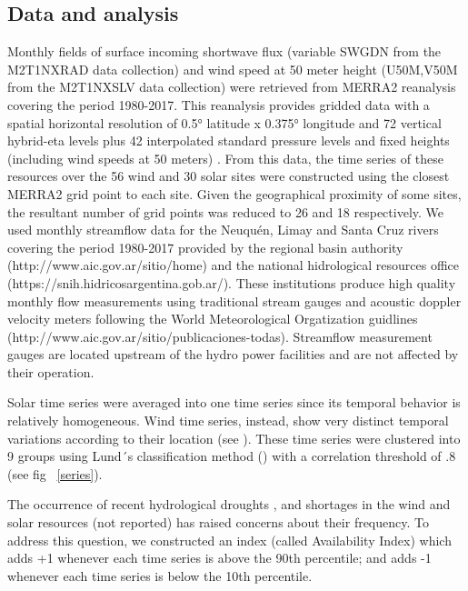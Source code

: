 \documentclass[AMA,Times1COL]{WileyNJDv5} %
\begin{document}
\begin{linenumbers}
\subsection{Data and analysis}

Monthly fields of surface incoming shortwave flux (variable SWGDN from the M2T1NXRAD data collection) and wind speed at 50 meter height (U50M,V50M from the M2T1NXSLV data collection) were retrieved from MERRA2 reanalysis \cite{} covering the period 1980-2017. This reanalysis provides gridded data with a spatial horizontal resolution of 0.5° latitude x 0.375° longitude and 72 vertical hybrid-eta levels plus 42 interpolated standard pressure levels and fixed heights (including wind speeds at 50 meters) \cite{bosilovich2015merra, gelaro2017modern}. From this data, the time series of these resources over the 56 wind and 30 solar sites were constructed using the closest MERRA2 grid point to each site. Given the geographical proximity of some sites, the resultant number of grid points was reduced to 26 and 18 respectively. We used monthly streamflow data for the Neuquén, Limay and Santa Cruz rivers covering the period 1980-2017 provided by the regional basin authority (http://www.aic.gov.ar/sitio/home) and the national hidrological resources office (https://snih.hidricosargentina.gob.ar/). These institutions produce high quality monthly flow measurements using traditional stream gauges and acoustic doppler velocity meters following the World Meteorological Orgatization guidlines (http://www.aic.gov.ar/sitio/publicaciones-todas). Streamflow measurement gauges are located upstream of the hydro power facilities and are not affected by their operation.

Solar time series were averaged into one time series since its temporal behavior is relatively homogeneous. Wind time series, instead, show very distinct temporal variations according to their location (see \cite{bianchi2019spatiotemporal}). These time series were clustered into 9 groups using Lund´s classification method (\cite{lund1963map}) with a correlation threshold of .8 (see fig ~\ref{series}).

The occurrence of recent hydrological droughts \cite{aguayo2021hydrological}, and shortages in the wind and solar resources (not reported) has raised concerns about their frequency. To address this question, we constructed an index (called Availability Index) which adds +1 whenever each time series is above the 90th percentile; and adds -1 whenever each time series is below the 10th percentile. 


\end{linenumbers}
\end{document}

